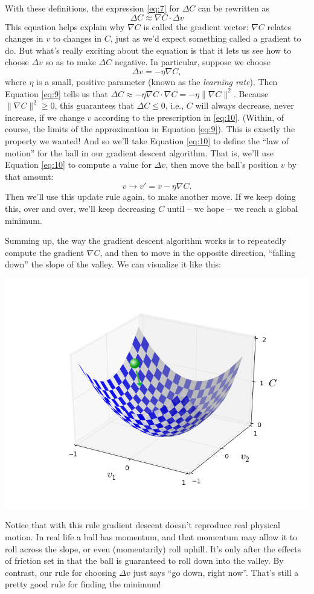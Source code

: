 \documentclass[a4paper,twoside,10pt]{book}
\begin{document}
With these definitions, the expression \ref{eq:7} for $\Delta C$ can be rewritten as
\begin{equation}
	\Delta C \approx \nabla C \cdot \Delta v
	\label{eq:9}
\end{equation}
This equation helps explain why $\nabla C$ is called the gradient vector: $\nabla C$ relates changes in $v$ to changes in $C$, just as we'd expect something called a gradient to do. But what's really exciting about the equation is that it lets us see how to choose $\Delta v$ so as to make $\Delta C$ negative. In particular, suppose we choose
\begin{equation}
	 \Delta v = -\eta \nabla C,
	 \label{eq:10}
\end{equation}
where $\eta$ is a small, positive parameter (known as the \textit{learning rate}). Then Equation \ref{eq:9} tells us that $ \Delta C \approx -\eta \nabla C \cdot \nabla C = -\eta \|\nabla C\|^2$. Because $\| \nabla C\|^2 \geq 0$, this guarantees that $\Delta C \leq 0$, i.e., $C$ will always decrease, never increase, if we change $v$ according to the prescription in \ref{eq:10}. (Within, of course, the limits of the approximation in Equation \ref{eq:9}). This is exactly the property we wanted! And so we'll take Equation \ref{eq:10} to define the ``law of motion'' for the ball in our gradient descent algorithm. That is, we'll use Equation \ref{eq:10} to compute a value for $\Delta v$, then move the ball's position $v$ by that amount:
\begin{equation}
v \to v' = v -\eta \nabla C. \label{eq:11}
\end{equation}
Then we'll use this update rule again, to make another move. If we keep doing this, over and over, we'll keep decreasing $C$ until -- we hope -- we reach a global minimum.

Summing up, the way the gradient descent algorithm works is to repeatedly compute the gradient $\nabla C$, and then to move in the opposite direction, ``falling down'' the slope of the valley. We can visualize it like this:
\begin{center}
	\includegraphics[width=0.65\linewidth]{./figures/ch1/valley_with_ball}
\end{center}
Notice that with this rule gradient descent doesn't reproduce real physical motion. In real life a ball has momentum, and that momentum may allow it to roll across the slope, or even (momentarily) roll uphill. It's only after the effects of friction set in that the ball is guaranteed to roll down into the valley. By contrast, our rule for choosing $\Delta v$ just says ``go down, right now''. That's still a pretty good rule for finding the minimum!
\end{document}
